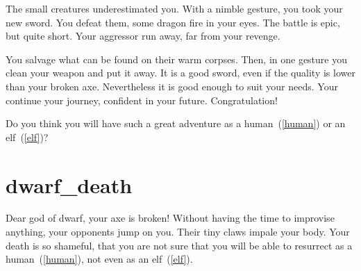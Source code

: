 The small creatures underestimated you. With a nimble gesture, you took your new
sword. You defeat them, some dragon fire in your eyes. The battle is epic, but
quite short. Your aggressor run away, far from your revenge.

You salvage what can be found on their warm corpses. Then, in one gesture you
clean your weapon and put it away. It is a good sword, even if the quality is
lower than your broken axe. Nevertheless it is good enough to suit your needs.
Your continue your journey, confident in your future. Congratulation!

\medbreak

Do you think you will have such a great adventure as a human~(\ref{human}) or
an elf~(\ref{elf})?

\section{dwarf_death}

Dear god of dwarf, your axe is broken! Without having the time to improvise
anything, your opponents jump on you. Their tiny claws impale your body. Your
death is so shameful, that you are not sure that you will be able to resurrect as
a human~(\ref{human}), not even as an elf~(\ref{elf}).
